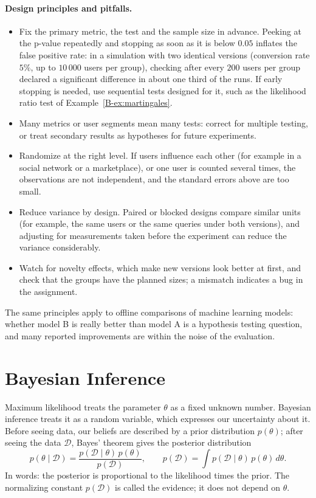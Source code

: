 \paragraph{Design principles and pitfalls.}
\begin{itemize}
    \item Fix the primary metric, the test and the sample size in advance. Peeking at the p-value repeatedly and stopping as soon as it is below $0.05$ inflates the false positive rate: in a simulation with two identical versions (conversion rate $5\%$, up to $10\,000$ users per group), checking after every $200$ users per group declared a significant difference in about one third of the runs. If early stopping is needed, use sequential tests designed for it, such as the likelihood ratio test of Example~\ref{B-ex:martingales}.
    \item Many metrics or user segments mean many tests: correct for multiple testing, or treat secondary results as hypotheses for future experiments.
    \item Randomize at the right level. If users influence each other (for example in a social network or a marketplace), or one user is counted several times, the observations are not independent, and the standard errors above are too small.
    \item Reduce variance by design. Paired or blocked designs compare similar units (for example, the same users or the same queries under both versions), and adjusting for measurements taken before the experiment can reduce the variance considerably.
    \item Watch for novelty effects, which make new versions look better at first, and check that the groups have the planned sizes; a mismatch indicates a bug in the assignment.
\end{itemize}
The same principles apply to offline comparisons of machine learning models: whether model B is really better than model A is a hypothesis testing question, and many reported improvements are within the noise of the evaluation.

\section{Bayesian Inference}\label{L4-sec:bayesian}

Maximum likelihood treats the parameter $\theta$ as a fixed unknown number. Bayesian inference treats it as a random variable, which expresses our uncertainty about it. Before seeing data, our beliefs are described by a prior distribution $p(\theta)$; after seeing the data $\mathcal{D}$, Bayes' theorem gives the posterior distribution
\[p(\theta \mid \mathcal{D}) = \frac{p(\mathcal{D} \mid \theta)\,p(\theta)}{p(\mathcal{D})}, \qquad p(\mathcal{D}) = \int p(\mathcal{D} \mid \theta)\,p(\theta) \, d\theta.\]
In words: the posterior is proportional to the likelihood times the prior. The normalizing constant $p(\mathcal{D})$ is called the evidence; it does not depend on $\theta$.

